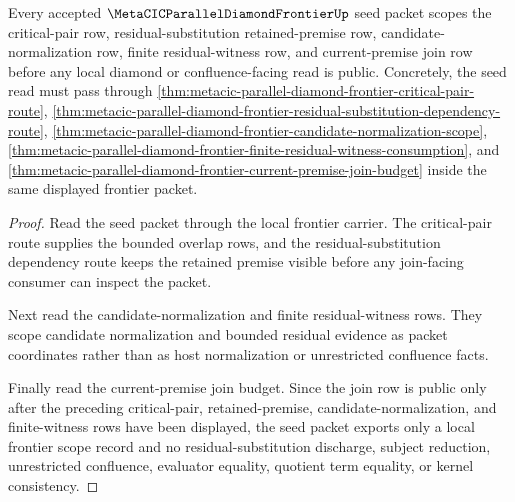 \begin{theorem}
\label{thm:metacic-parallel-diamond-frontier-seed-obligation-scope}
Every accepted $\MetaCICParallelDiamondFrontierUp$ seed packet scopes the critical-pair row, residual-substitution retained-premise row, candidate-normalization row, finite residual-witness row, and current-premise join row before any local diamond or confluence-facing read is public. Concretely, the seed read must pass through \autoref{thm:metacic-parallel-diamond-frontier-critical-pair-route}, \autoref{thm:metacic-parallel-diamond-frontier-residual-substitution-dependency-route}, \autoref{thm:metacic-parallel-diamond-frontier-candidate-normalization-scope}, \autoref{thm:metacic-parallel-diamond-frontier-finite-residual-witness-consumption}, and \autoref{thm:metacic-parallel-diamond-frontier-current-premise-join-budget} inside the same displayed frontier packet.
\end{theorem}
\begin{proof}
Read the seed packet through the local frontier carrier. The critical-pair route supplies the bounded overlap rows, and the residual-substitution dependency route keeps the retained premise visible before any join-facing consumer can inspect the packet.

Next read the candidate-normalization and finite residual-witness rows. They scope candidate normalization and bounded residual evidence as packet coordinates rather than as host normalization or unrestricted confluence facts.

Finally read the current-premise join budget. Since the join row is public only after the preceding critical-pair, retained-premise, candidate-normalization, and finite-witness rows have been displayed, the seed packet exports only a local frontier scope record and no residual-substitution discharge, subject reduction, unrestricted confluence, evaluator equality, quotient term equality, or kernel consistency.
\end{proof}
